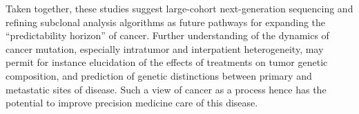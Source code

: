 Taken together, these studies suggest large-cohort next-generation sequencing and refining subclonal analysis algorithms as future pathways for expanding the ``predictability horizon'' of cancer. Further understanding of the dynamics of cancer mutation, especially intratumor and interpatient heterogeneity, may permit for instance elucidation of the effects of treatments on tumor genetic composition, and prediction of genetic distinctions between primary and metastatic sites of disease. Such a view of cancer as a process hence has the potential to improve precision medicine care of this disease.
